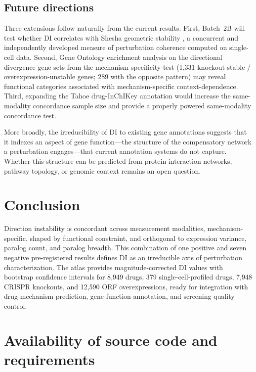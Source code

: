 \documentclass[11pt]{article}
\begin{document}
\subsection{Future directions}

Three extensions follow naturally from the current results.  First,
Batch~2B will test whether DI correlates with Shesha geometric
stability \citep{raju2026a, raju2026b}, a concurrent and independently
developed measure of perturbation coherence computed on single-cell
data.  Second, Gene Ontology enrichment analysis on the directional
divergence gene sets from the mechanism-specificity test (1{,}331 knockout-stable /
overexpression-unstable genes; 289 with the opposite pattern) may reveal
functional categories associated with mechanism-specific
context-dependence.  Third, expanding the Tahoe drug-InChIKey
annotation would increase the same-modality concordance sample size and provide a properly
powered same-modality concordance test.

More broadly, the irreducibility of DI to existing gene annotations
suggests that it indexes an aspect of gene function---the structure of
the compensatory network a perturbation engages---that current
annotation systems do not capture.  Whether this structure can be
predicted from protein interaction networks, pathway topology, or
genomic context remains an open question.

\section{Conclusion}

Direction instability is concordant across measurement modalities,
mechanism-specific, shaped by functional constraint, and orthogonal to
expression variance, paralog count, and paralog breadth.  This
combination of one positive and seven negative pre-registered results
defines DI as an irreducible axis of perturbation characterization.  The
atlas provides magnitude-corrected DI values with bootstrap confidence
intervals for 8{,}949 drugs, 379 single-cell-profiled drugs, 7{,}948
CRISPR knockouts, and 12{,}590 ORF overexpressions, ready for
integration with drug-mechanism prediction, gene-function annotation,
and screening quality control.



\section*{Availability of source code and requirements}
\end{document}
